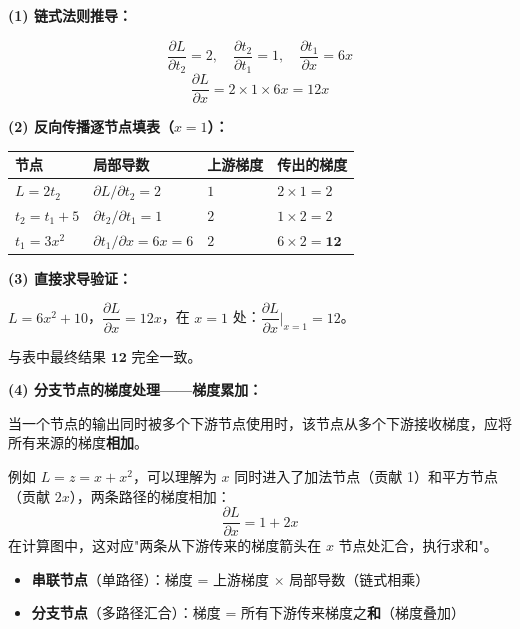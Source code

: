 \documentclass[a4paper,11pt]{ctexart}
\begin{document}
\begin{solutionbox}[参考答案与详细解析]
    \textbf{(1) 链式法则推导：}

    \[
    \frac{\partial L}{\partial t_2} = 2, \quad \frac{\partial t_2}{\partial t_1} = 1, \quad \frac{\partial t_1}{\partial x} = 6x
    \]
    \[
    \frac{\partial L}{\partial x} = 2 \times 1 \times 6x = 12x
    \]

    \textbf{(2) 反向传播逐节点填表（$x=1$）：}

    \begin{center}
    \begin{tabular}{p{1.5cm} p{3.0cm} p{3.5cm} p{3.0cm}}
        \toprule
        节点 & 局部导数 & 上游梯度 & 传出的梯度 \\
        \midrule
        $L=2t_2$ & $\partial L/\partial t_2 = 2$ & $1$ & $2 \times 1 = 2$ \\[0.8em]
        $t_2=t_1+5$ & $\partial t_2/\partial t_1 = 1$ & $2$ & $1 \times 2 = 2$ \\[0.8em]
        $t_1=3x^2$ & $\partial t_1/\partial x = 6x=6$ & $2$ & $6 \times 2 = \mathbf{12}$ \\
        \bottomrule
    \end{tabular}
    \end{center}

    \textbf{(3) 直接求导验证：}

    $L = 6x^2 + 10$，$\dfrac{\partial L}{\partial x} = 12x$，在 $x=1$ 处：$\dfrac{\partial L}{\partial x}\big|_{x=1} = 12$。

    与表中最终结果 $\mathbf{12}$ 完全一致。\checkmark

    \textbf{(4) 分支节点的梯度处理——梯度累加：}

    当一个节点的输出同时被多个下游节点使用时，该节点从多个下游接收梯度，应将所有来源的梯度\textbf{相加}。

    例如 $L = z = x + x^2$，可以理解为 $x$ 同时进入了加法节点（贡献 1）和平方节点（贡献 $2x$），两条路径的梯度相加：
    \[
    \frac{\partial L}{\partial x} = 1 + 2x
    \]
    在计算图中，这对应"两条从下游传来的梯度箭头在 $x$ 节点处汇合，执行求和"。

    \begin{keybox}[反向传播两大规则速记]
        \begin{itemize}
            \item \textbf{串联节点}（单路径）：梯度 = 上游梯度 $\times$ 局部导数（链式相乘）
            \item \textbf{分支节点}（多路径汇合）：梯度 = 所有下游传来梯度之\textbf{和}（梯度叠加）
        \end{itemize}
    \end{keybox}
\end{solutionbox}
\end{document}
